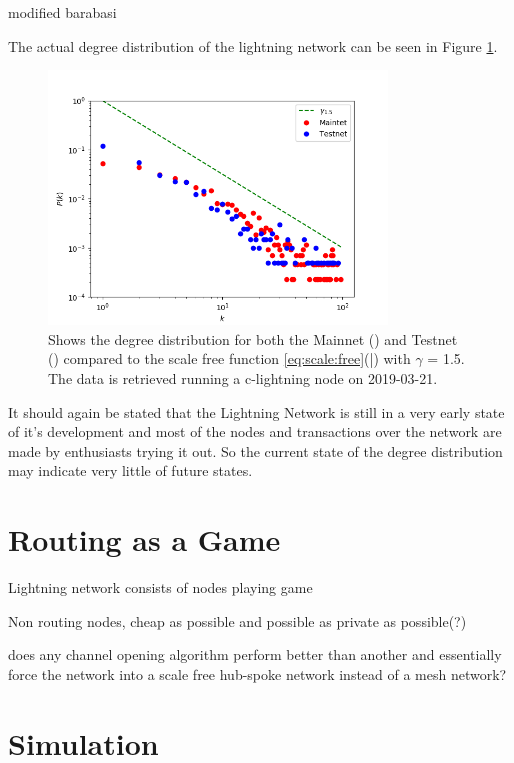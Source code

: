 modified barabasi

The actual degree distribution of the lightning network can be seen in Figure \ref{fig:real_network}.

\begin{figure}[!htb]
	\hspace*{-0.5cm} 
	\centering
	\includegraphics[width=9cm]{images/main-testnet_degree_distribution.png}
	\caption{Shows the degree distribution for both the Mainnet (\tikzcircle[red, fill=red]{2pt}) and Testnet (\tikzcircle[blue, fill=blue]{2pt})
		compared to the scale free function \ref{eq:scale:free}(\textcolor{black}{|}) with $\gamma$ = 1.5. The data is retrieved running a c-lightning node\cite{repository:clightning} on 2019-03-21.
	}
	\label{fig:real_network}
	\hspace*{2mm} 
\end{figure}

It should again be stated that the Lightning Network is still in a very early state of it's development and most of the nodes and transactions over the network are made by enthusiasts trying it out. So the current state of the degree distribution may indicate very little of future states. 

\section{Routing as a Game}

Lightning network consists of nodes playing game

Non routing nodes, cheap as possible and possible as private as possible(?) 

does any channel opening algorithm perform better than another and essentially force the network into a scale free hub-spoke network instead of a mesh network?

\section{Simulation}



